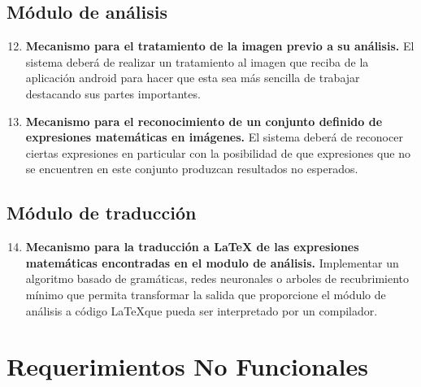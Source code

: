     \subsection{Módulo de análisis}
    \begin{enumerate}[label=\textbf{RF\arabic*.}]
    	\setcounter{enumi}{11}
    	\item \textbf{Mecanismo para el tratamiento de la imagen previo a su análisis.} El sistema deberá de realizar un tratamiento al imagen que reciba de la aplicación android para hacer que esta sea más sencilla de trabajar destacando sus partes importantes.
    	\item \textbf{Mecanismo para el reconocimiento de un conjunto definido de expresiones matemáticas en imágenes.} El sistema deberá de reconocer ciertas expresiones en particular con la posibilidad de que expresiones que no se encuentren en este conjunto produzcan resultados no esperados.
    \end{enumerate}
    
    \subsection{Módulo de traducción}
    \begin{enumerate}[label=\textbf{RF\arabic*.}]
    	\setcounter{enumi}{13}
    	\item \textbf{Mecanismo para la traducción a \LaTeX{} de las expresiones matemáticas encontradas en el modulo de análisis.} Implementar un algoritmo basado de gramáticas, redes neuronales o arboles de recubrimiento mínimo que permita transformar la salida que proporcione el módulo de análisis a código \LaTeX que pueda ser interpretado por un compilador.
    \end{enumerate}
    
\section{Requerimientos No Funcionales} 

 

